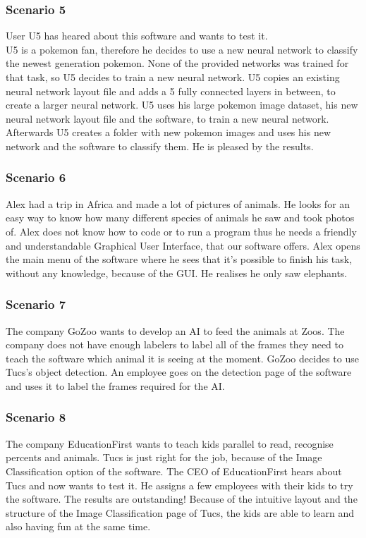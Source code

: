\documentclass[parskip=full]{scrartcl}
\begin{document}
\subsubsection{Scenario 5}
User U5 has heared about this software and wants to test it. \\
U5 is a pokemon fan, therefore he decides to use a new neural network to classify the newest generation pokemon. None of the provided networks was trained for that task, so U5 decides to train a new neural network. U5 copies an existing neural network layout file and adds a 5 fully connected layers in between, to create a larger neural network. U5 uses his large pokemon image dataset, his new neural network layout file and the software, to train a new neural network. \\
Afterwards U5 creates a folder with new pokemon images and uses his new network and the software to classify them. He is pleased by the results.
\subsubsection{Scenario 6}
Alex had a trip in Africa and made a lot of pictures of animals. He looks for an easy way to know how many different species of animals he saw and took photos of. Alex does not know how to code or to run a program thus he needs a friendly and understandable Graphical User Interface, that our software offers. Alex opens the main menu of the software where he sees that it's possible to finish his task, without any knowledge, because of the GUI. He realises he only saw elephants.
\newpage
\subsubsection{Scenario 7}
The company GoZoo wants to develop an AI to feed the animals at Zoos. The company does not have enough labelers to label all of the frames they need to teach the software which animal it is seeing at the moment. GoZoo decides to use Tucs's object detection. An employee goes on the detection page of the software and uses it to label the frames required for the AI.
\subsubsection{Scenario 8}
The company EducationFirst wants to teach kids parallel to read, recognise percents and animals. Tucs is just right for the job, because of the Image Classification option of the software. The CEO of EducationFirst hears about Tucs and now wants to test it. He assigns a few employees with their kids to try the software. The results are outstanding! Because of the intuitive layout and the structure of the Image Classification page of Tucs, the kids are able to learn and also having fun at the same time.
\clearpage
\end{document}

